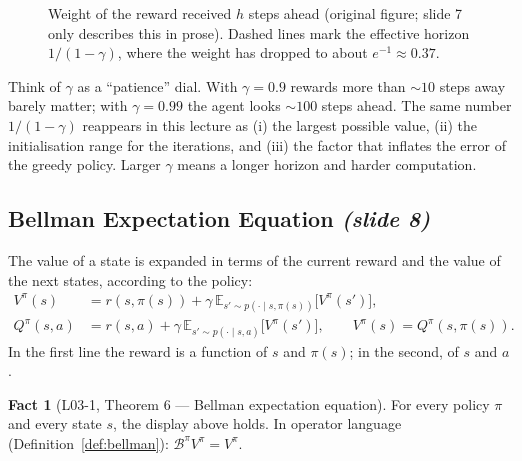 \documentclass[11pt,a4paper]{article}
\newcommand{\E}{\mathbb{E}}
\newcommand{\Bpi}{\mathcal{B}^{\pi}}
\newcommand{\slide}[1]{\texorpdfstring{\emph{(slide #1)}}{(slide #1)}}
\theoremstyle{plain}
\theoremstyle{definition}
\newtheorem{fact}{Fact}\renewcommand{\thefact}{F\arabic{fact}}
\theoremstyle{remark}
\begin{document}
\begin{figure}[htbp]
\centering
{}
\caption{Weight of the reward received $h$ steps ahead (original figure; slide 7 only describes this in prose). Dashed lines mark the effective horizon $1/(1-\gamma)$, where the weight has dropped to about $e^{-1}\approx0.37$.}
\label{fig:discount}
\end{figure}

\begin{intuition}
Think of $\gamma$ as a ``patience'' dial. With $\gamma=0.9$ rewards more than $\sim10$ steps away barely matter; with $\gamma=0.99$ the agent looks $\sim100$ steps ahead. The same number $1/(1-\gamma)$ reappears in this lecture as (i) the largest possible value, (ii) the initialisation range for the iterations, and (iii) the factor that inflates the error of the greedy policy. Larger $\gamma$ means a longer horizon and harder computation.
\end{intuition}

\subsection{Bellman Expectation Equation \slide{8}}
The value of a state is expanded in terms of the current reward and the value of the next states, according to the policy:
\begin{align*}
V^\pi(s)&=r(s,\pi(s))+\gamma\,\E_{s'\sim p(\cdot\mid s,\pi(s))}\big[V^\pi(s')\big],\\
Q^\pi(s,a)&=r(s,a)+\gamma\,\E_{s'\sim p(\cdot\mid s,a)}\big[V^\pi(s')\big],\qquad V^\pi(s)=Q^\pi(s,\pi(s)).
\end{align*}
In the first line the reward is a function of $s$ and $\pi(s)$; in the second, of $s$ and $a$.

\begin{fact}[L03-1, Theorem 6 --- Bellman expectation equation]\label{fact:bexp}
For every policy $\pi$ and every state $s$, the display above holds. In operator language (Definition~\ref{def:bellman}): $\Bpi V^\pi=V^\pi$.
\end{fact}
\end{document}

